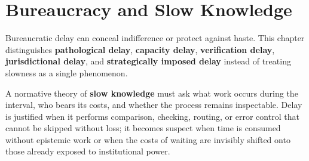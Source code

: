 
\chapter{Bureaucracy and Slow Knowledge}
\label{ch:ch057}

Bureaucratic delay can conceal indifference or protect against haste. This chapter distinguishes \textbf{pathological delay}, \textbf{capacity delay}, \textbf{verification delay}, \textbf{jurisdictional delay}, and \textbf{strategically imposed delay} instead of treating slowness as a single phenomenon.

A normative theory of \textbf{slow knowledge} must ask what work occurs during the interval, who bears its costs, and whether the process remains inspectable. Delay is justified when it performs comparison, checking, routing, or error control that cannot be skipped without loss; it becomes suspect when time is consumed without epistemic work or when the costs of waiting are invisibly shifted onto those already exposed to institutional power.
